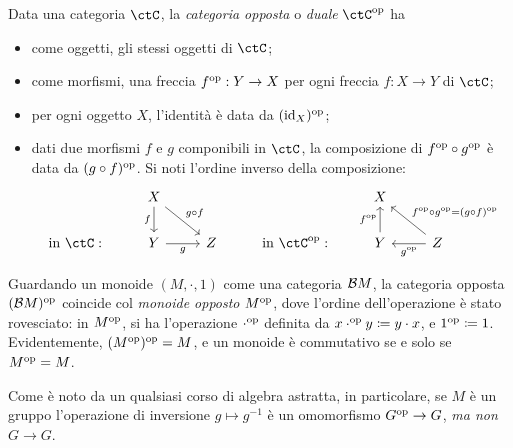 \begin{definition}\label{def_cat_opp}
	Data una categoria \(\ctC\), la \emph{categoria opposta} o \emph{duale} \(\ctC^\op\) ha
	\begin{itemize}
		\item come oggetti, gli stessi oggetti di \(\ctC\);
		\item come morfismi, una freccia \(f^{\text{op}}:Y\to X\) per ogni freccia \(f:X\to Y\) di \(\ctC\);
		\item per ogni oggetto \(X\), l'identità è data da \((\mathrm{id}_X)^{\text{op}}\);
		\item dati due morfismi \(f\) e \(g\) componibili in \(\ctC\), la composizione di \(f^{\text{op}}\circ g^{\text{op}}\) è data da \((g\circ f)^{\text{op}}\). Si noti l'ordine inverso della composizione:
		      \[\begin{tikzcd}
				      & X &&& X \\
				      {\text{in }\ctC:} & Y & Z & {\text{in }\ctC^\op:} & Y & Z
				      \arrow["f"', from=1-2, to=2-2]
				      \arrow["g"', from=2-2, to=2-3]
				      \arrow["{g^\op}", from=2-6, to=2-5]
				      \arrow["{f^\op}", from=2-5, to=1-5]
				      \arrow["{g\cmp f}", from=1-2, to=2-3]
				      \arrow["{f^\op\cmp g^\op = (g\cmp f)^\op}"', from=2-6, to=1-5]
			      \end{tikzcd}\]
	\end{itemize}
\end{definition}
\begin{example}\label{mon_opposti_cat_opposte}
	Guardando un monoide \((M,\cdot,1)\) come una categoria \(\mathcal{B} M\), la categoria opposta \((\mathcal{B} M)^{\text{op}}\) coincide col \emph{monoide opposto} \(M^{\text{op}}\), dove l'ordine dell'operazione è stato rovesciato: in \(M^{\text{op}}\), si ha l'operazione \(\cdot^{\text{op}}\) definita da \(x\cdot^{\text{op}} y \coloneqq y\cdot x\), e \(1^{\text{op}} \coloneqq 1\). Evidentemente, \((M^{\text{op}})^{\text{op}} = M\), e un monoide è commutativo se e solo se \(M^{\text{op}}=M\).

	Come è noto da un qualsiasi corso di algebra astratta, in particolare, se \(M\) è un gruppo l'operazione di inversione \(g\mapsto g^{-1}\) è un omomorfismo \(G^{\text{op}}\to G\), \emph{ma non} \(G\to G\).
\end{example}
